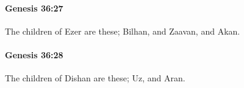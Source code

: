 		\paragraph{Genesis 36:27} %
			\label{GENESIS-36-27}

			The children of Ezer are these; Bilhan, and Zaavan, and Akan.


		\paragraph{Genesis 36:28} %
			\label{GENESIS-36-28}

			The children of Dishan are these; Uz, and Aran.



